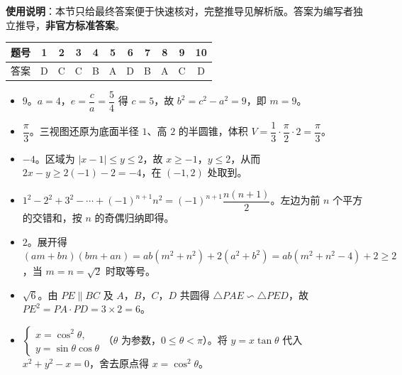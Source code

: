 
\begin{gknotice}
\textbf{使用说明}：本节只给最终答案便于快速核对，完整推导见解析版。答案为编写者独立推导，\textbf{非官方标准答案}。
\end{gknotice}

\begin{center}\begin{tabular}{ccccccccccc}
\toprule
题号 & 1 & 2 & 3 & 4 & 5 & 6 & 7 & 8 & 9 & 10 \\
\midrule
答案 & D & C & C & B & A & D & B & A & C & D \\
\bottomrule
\end{tabular}\end{center}

\begin{itemize}[leftmargin=2.6em]
  \item[\textbf{11.}] $9$。$a=4$，$e=\dfrac ca=\dfrac54$ 得 $c=5$，故 $b^2=c^2-a^2=9$，即 $m=9$。
  \item[\textbf{12.}] $\dfrac{\pi}{3}$。三视图还原为底面半径 $1$、高 $2$ 的半圆锥，体积 $V=\dfrac13\cdot\dfrac{\pi}{2}\cdot2=\dfrac\pi3$。
  \item[\textbf{13.}] $-4$。区域为 $|x-1|\leqslant y\leqslant2$，故 $x\geqslant-1$，$y\leqslant2$，从而 $2x-y\geqslant2(-1)-2=-4$，在 $(-1,2)$ 处取到。
  \item[\textbf{14.}] $1^2-2^2+3^2-\cdots+(-1)^{n+1}n^2=(-1)^{n+1}\dfrac{n(n+1)}2$。左边为前 $n$ 个平方的交错和，按 $n$ 的奇偶归纳即得。
  \item[\textbf{15.}] $2$。展开得 $(am+bn)(bm+an)=ab(m^2+n^2)+2(a^2+b^2)=ab(m^2+n^2-4)+2\geqslant2$，当 $m=n=\sqrt2$ 时取等号。
  \item[\textbf{16.}] $\sqrt6$。由 $PE\parallel BC$ 及 $A$，$B$，$C$，$D$ 共圆得 $\triangle PAE\backsim\triangle PED$，故 $PE^2=PA\cdot PD=3\times2=6$。
  \item[\textbf{17.}] $\begin{cases}x=\cos^2\theta,\\ y=\sin\theta\cos\theta\end{cases}$（$\theta$ 为参数，$0\leqslant\theta<\pi$）。将 $y=x\tan\theta$ 代入 $x^2+y^2-x=0$，舍去原点得 $x=\cos^2\theta$。
\end{itemize}

